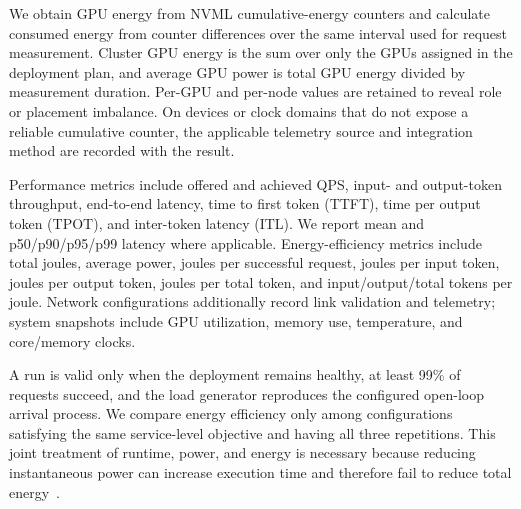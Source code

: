 We obtain GPU energy from NVML cumulative-energy counters and calculate consumed energy from counter differences over the same interval used for request measurement. Cluster GPU energy is the sum over only the GPUs assigned in the deployment plan, and average GPU power is total GPU energy divided by measurement duration. Per-GPU and per-node values are retained to reveal role or placement imbalance. On devices or clock domains that do not expose a reliable cumulative counter, the applicable telemetry source and integration method are recorded with the result.

Performance metrics include offered and achieved QPS, input- and output-token throughput, end-to-end latency, time to first token (TTFT), time per output token (TPOT), and inter-token latency (ITL). We report mean and p50/p90/p95/p99 latency where applicable. Energy-efficiency metrics include total joules, average power, joules per successful request, joules per input token, joules per output token, joules per total token, and input/output/total tokens per joule. Network configurations additionally record link validation and telemetry; system snapshots include GPU utilization, memory use, temperature, and core/memory clocks.

A run is valid only when the deployment remains healthy, at least 99\% of requests succeed, and the load generator reproduces the configured open-loop arrival process. We compare energy efficiency only among configurations satisfying the same service-level objective and having all three repetitions. This joint treatment of runtime, power, and energy is necessary because reducing instantaneous power can increase execution time and therefore fail to reduce total energy~\cite{zhang2026distributedenergy}.
